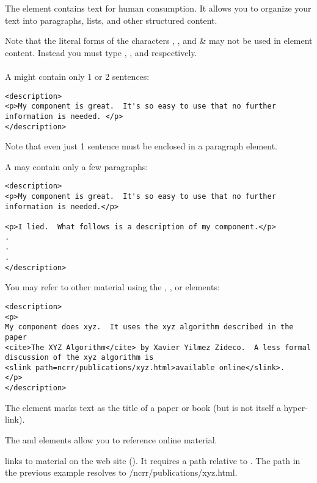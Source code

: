 \documentclass[11pt]{article}
\begin{document}
The  element contains text for human consumption.
It allows you to organize your text into paragraphs, lists, and
other structured content.

Note that the literal forms of the characters \la, \ra, and \& may not be
used in element content.  Instead you must type ,
, and  respectively.

\paragraph{\SUBSUBSECcommonUsage}
\label{\SUBSUBSECcommonUsage}

A  might contain only 1 or 2 sentences:

\begin{verbatim}
<description>
<p>My component is great.  It's so easy to use that no further
information is needed. </p>
</description>
\end{verbatim}

Note that even just 1 sentence must be enclosed in a paragraph element.

A  may contain only a few paragraphs:

\begin{verbatim}
<description>
<p>My component is great.  It's so easy to use that no further
information is needed.</p>

<p>I lied.  What follows is a description of my component.</p>
.
.
.
</description>
\end{verbatim}

You may refer to other material using the , ,
or  elements:

\begin{verbatim}
<description>
<p>
My component does xyz.  It uses the xyz algorithm described in the paper
<cite>The XYZ Algorithm</cite> by Xavier Yilmez Zideco.  A less formal
discussion of the xyz algorithm is
<slink path=ncrr/publications/xyz.html>available online</slink>. 
</p>
</description>
\end{verbatim}

The  element marks text as the title of a paper or
book (but is not itself a hyper-link).

The  and  elements allow you to reference
online material.

 links to material on the \sci{} 
web site (\sciurl).  It requires a path 
relative to \sciurl.  The path in the previous example resolves to
\sciurl{}/ncrr/publications/xyz.html.
\end{document}
